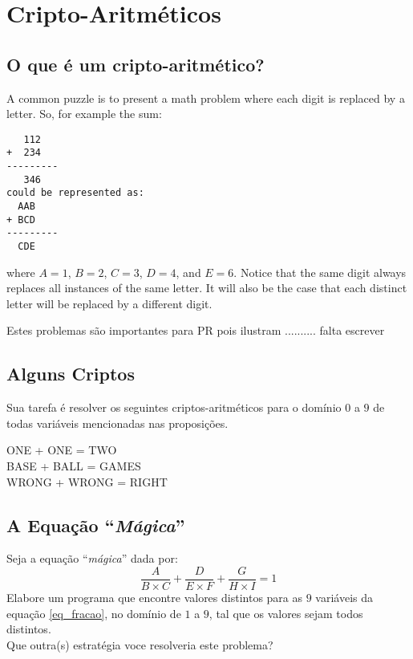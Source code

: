 
\section{Cripto-Aritméticos}

\subsection{O que é um cripto-aritmético?}

A common puzzle is to present a math problem where each digit is replaced by a letter.  So, for example the sum:
\begin{verbatim}
   112
+  234
---------
   346
could be represented as:
  AAB
+ BCD
---------
  CDE
\end{verbatim}
where $A=1$, $B=2$, $C=3$, $D=4$, and $E=6$.  Notice that the same digit always replaces all instances of the same letter.  It will also be the case that each distinct letter will be replaced by a different digit.

Estes problemas são importantes para PR pois ilustram .......... falta escrever 


\subsection{Alguns Criptos}

Sua tarefa é resolver os seguintes criptos-aritméticos para o domínio
$0$ a $9$ de todas variáveis mencionadas nas
proposições.

\begin{description}
\item [ONE + ONE = TWO]

  \item[BASE + BALL = GAMES] 

\item [WRONG + WRONG = RIGHT]

\end{description}


\subsection{A Equação \/ ``{\em Mágica}''}

 Seja a equação \/ ``{\em mágica}''\/ dada por:
$$
\frac{A}{B \times C} + \frac{D}{E \times F} + \frac{G}{H \times I} = 1
\label{eq_fracao}
$$
Elabore um programa que encontre valores distintos para as $9$ variáveis
da equação \ref{eq_fracao}, no domínio de $1$ a $9$, tal que
os valores sejam todos distintos.\\

Que outra(s) estratégia voce resolveria este problema?

